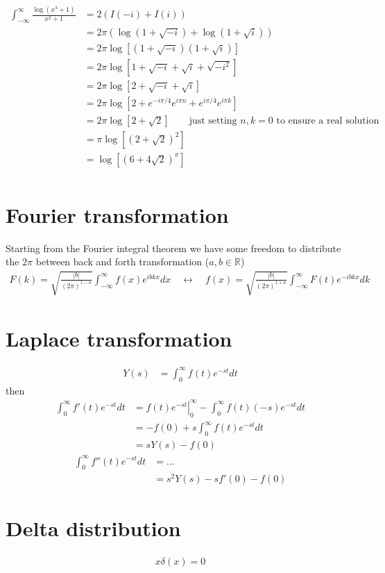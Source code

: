\documentclass[10pt,a4paper]{book}
\theoremstyle{definition}
\begin{document}
\begin{align}
\int_{-\infty}^{\infty}\frac{\log(x^4+1)}{x^2+1}
&=2\left(I(-i)+I(i)\right)\\
&=2\pi\left(\log(1+\sqrt{-i})+\log(1+\sqrt{i})\right)\\
&=2\pi\log[(1+\sqrt{-i})(1+\sqrt{i})]\\
&=2\pi\log[1+\sqrt{-i}+\sqrt{i}+\sqrt{-i^2}]\\
&=2\pi\log[2+\sqrt{-i}+\sqrt{i}]\\
&=2\pi\log[2+e^{-i\pi/4}e^{i\pi n}+e^{i\pi/4}e^{i\pi k}]\\
&=2\pi\log[2+\sqrt{2}]\qquad\text{just setting $n,k=0$ to ensure a real solution}\\
&=\pi\log[(2+\sqrt{2})^2]\\
&=\log[(6+4\sqrt{2})^\pi]\\
\end{align}


\section{Fourier transformation}
Starting from the Fourier integral theorem we have some freedom to distribute the $2\pi$ between back and forth transformation ($a,b\in\mathbb{R}$)
\begin{align}
    F(k)=\sqrt{\frac{|b|}{(2\pi)^{1-a}}}\int_{-\infty}^\infty f(x)e^{ibkx}dx\quad\leftrightarrow\quad f(x)=\sqrt{\frac{|b|}{(2\pi)^{1+a}}}\int_{-\infty}^\infty F(t)e^{-ibkx}dk
\end{align}

\section{Laplace transformation}
\begin{align}
Y(s)&=\int_0^\infty f(t)e^{-st}dt
\end{align}
then
\begin{align}
\int_0^\infty f'(t)e^{-st}dt
&=\left.f(t)e^{-st}\right|_0^\infty-\int_0^\infty f(t)(-s)e^{-st}dt\\
&=-f(0)+s\int_0^\infty f(t)e^{-st}dt\\
&=sY(s)-f(0)
\end{align}
\begin{align}
\int_0^\infty f''(t)e^{-st}dt
&=...\\
&=s^2Y(s)-sf'(0)-f(0)
\end{align}

\section{Delta distribution}
\begin{align}
x\delta(x)=0
\end{align}
\end{document}
